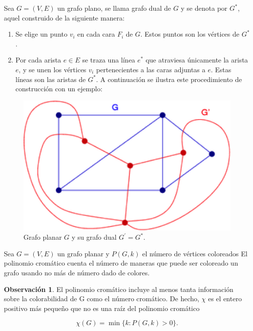 \documentclass[spanish, utf8,handout]{beamer} %
\theoremstyle{definition}
\newtheorem{remark}{Observación}
\begin{document}
\begin{frame}[allowframebreaks]
\begin{example}
	Sea $G=(V,E)$ un grafo plano, se llama grafo dual de $G$ y se denota por $G^{\ast}$, aquel construido de la siguiente manera:
	
	\begin{enumerate}
		\item Se elige un punto $v_i$ en cada cara $F_i$ de $G$. Estos puntos son los vértices de $G^{\ast}$.
		
		\item Por cada arista $e\in E$ se traza una línea $e^{\ast}$ que atraviesa únicamente la arista $e$, y se unen los vértices $v_i$ pertenecientes a las caras adjuntas a $e$. Estas líneas son las aristas de $G^{\ast}$. A continuación se ilustra este procedimiento de construcción con un ejemplo:
	\end{enumerate}
\end{example}

\begin{figure}[H]
	\captionsetup{justification=centering,margin=0.5cm}
	\centering
	\includegraphics{example3.png}
	\caption{Grafo planar $G$ y	su grafo dual $G^{\prime}=G^{\ast}$.}
\end{figure}

\begin{definition}
Sea $G=(V,E)$ un grafo planar y $P(G,k)$ el número de vértices coloreados
El polinomio cromático cuenta el número de maneras que puede ser coloreado un grafo usando no más de número dado de colores.
\end{definition}

\begin{remark}
El polinomio cromático incluye al menos tanta información sobre la colorabilidad de G como el número cromático. De hecho, $\chi$ es el entero positivo más pequeño que no es una raíz del polinomio cromático

\begin{equation*}
\chi(G)=\min\{k\colon P(G,k)>0\}.
\end{equation*}
\end{remark}

\end{frame}
\end{document}
